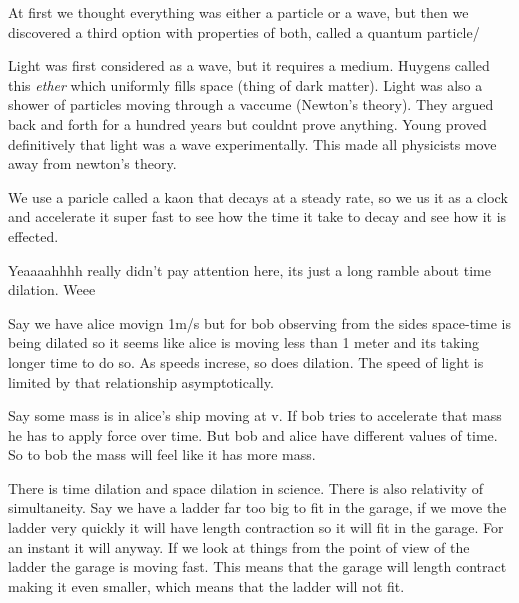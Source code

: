 \documentclass{article}
\begin{document}
At first we thought everything was either a particle or a wave, but then we discovered a third option with properties of both, called a quantum particle/

Light was first considered as a wave, but it requires a medium. Huygens called this \emph{ether} which uniformly fills space (thing of dark matter). Light was also a shower of particles moving through a vaccume (Newton's theory). They argued back and forth for a hundred years but couldnt prove anything. Young proved definitively that light was a wave experimentally. This made all physicists move away from newton's theory.

We use a paricle called a kaon that decays at a steady rate, so we us it as a clock and accelerate it super fast to see how the time it take to decay and see how it is effected.


Yeaaaahhhh really didn't pay attention here, its just a long ramble about time dilation. Weee




Say we have alice movign 1m/s but for bob observing from the sides space-time is being dilated so it seems like alice is moving less than 1 meter and its taking longer time to do so. As speeds increse, so does dilation. The speed of light is limited by that relationship asymptotically.

Say some mass is in alice's ship moving at v. If bob tries to accelerate that mass he has to apply force over time. But bob and alice have different values of time. So to bob the mass will feel like it has more mass.

There is time dilation and space dilation in science. There is also relativity of simultaneity. Say we have a ladder far too big to fit in the garage, if we move the ladder very quickly it will have length contraction so it will fit in the garage. For an instant it will anyway. If we look at things from the point of view of the ladder the garage is moving fast. This means that the garage will length contract making it even smaller, which means that the ladder will not fit.
\end{document}
